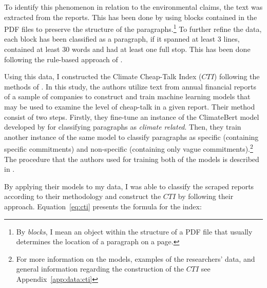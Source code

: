 \documentclass[12pt]{article}
\begin{document}
To identify this phenomenon in relation to the environmental claims, the text was extracted from the reports. This has been done by using blocks contained in the PDF files to preserve the structure of the paragraphs.\footnote{By \textit{blocks}, I mean an object within the structure of a PDF file that usually determines the location of a paragraph on a page.} To further refine the data, each block has been classified as a paragraph, if it spanned at least 3 lines, contained at least 30 words and had at least one full stop. This has been done following the rule-based approach of \textcite{bingler_how_2024}. 

Using this data, I constructed the Climate Cheap-Talk Index ($CTI$) following the methods of \textcite{bingler_how_2024}. In this study, the authors utilize text from annual financial reports of a sample of companies to construct and train machine learning models that may be used to examine the level of cheap-talk in a given report. Their method consist of two steps. Firstly, they fine-tune an instance of the ClimateBert model developed by \textcite{wkbl2022climatebert} for classifying paragraphs as \textit{climate related}. Then, they train another instance of the same model to classify paragraphs as specific (containing specific commitments) and non-specific (containing only vague commitments).\footnote{For more information on the models, examples of the researchers' data, and general information regarding the construction of the $CTI$ see Appendix~\ref{app:data:cti}} The procedure that the authors used for training both of the models is described in \textcite{bingler_cheap_2022,bingler_how_2024}.

By applying their models to my data, I was able to classify the scraped reports according to their methodology and construct the $CTI$ by following their approach. Equation~\ref{eq:cti} presents the formula for the index:


\end{document}
